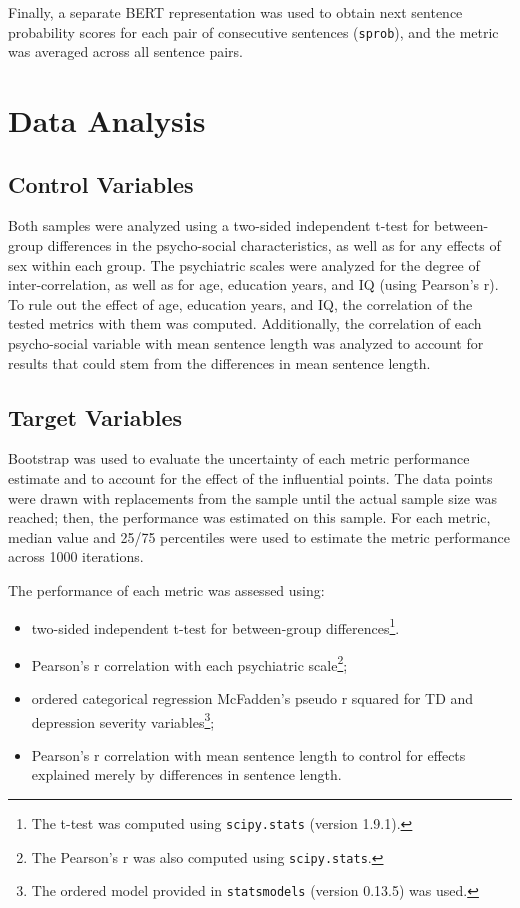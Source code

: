 Finally, a separate BERT representation was used to obtain next sentence probability scores for each pair of consecutive sentences (\texttt{sprob}), and the metric was averaged across all sentence pairs. 

\section{Data Analysis}
\label{sec:methods:stats:clinical}

\subsection{Control Variables}
Both samples were analyzed using a two-sided independent t-test for between-group differences in the psycho-social characteristics, as well as for any effects of sex within each group. The psychiatric scales were analyzed for the degree of inter-correlation, as well as for age, education years, and IQ (using Pearson's r). To rule out the effect of age, education years, and IQ, the correlation of the tested metrics with them was computed. Additionally, the correlation of each psycho-social variable with mean sentence length was analyzed to account for results that could stem from the differences in mean sentence length.

\subsection{Target Variables}
Bootstrap was used to evaluate the uncertainty of each metric performance estimate and to account for the effect of the influential points. The data points were drawn with replacements from the sample until the actual sample size was reached; then, the performance was estimated on this sample. For each metric, median value and 25/75 percentiles were used to estimate the metric performance across 1000 iterations.

The performance of each metric was assessed using:
\begin{itemize}
    \item two-sided independent t-test for between-group differences\footnote{The t-test was computed using \texttt{scipy.stats} (version 1.9.1).}. %
    \item Pearson's r correlation with each psychiatric scale\footnote{The Pearson's r was also computed using \texttt{scipy.stats}.};
    \item ordered categorical regression McFadden’s pseudo r squared for TD and depression severity variables\footnote{The ordered model provided in \texttt{statsmodels} (version 0.13.5) was used.};
    \item Pearson's r correlation with mean sentence length to control for effects explained merely by differences in sentence length.
\end{itemize}

